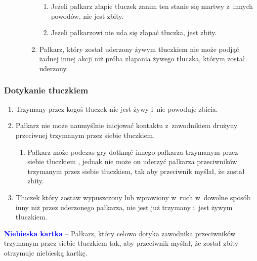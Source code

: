 \documentclass[12pt]{article}
\newcommand\bluecard[1]{\bgroup\textcolor{blue}{\textbf{#1}}}
\begin{document}
\begin{enumerate}
\begin{enumerate}
\begin{enumerate}
			                  \begin{enumerate}
				                  \item
				                        Jeżeli pałkarz złapie tłuczek zanim ten stanie się martwy z~innych powodów, nie jest zbity.
				                  \item
				                        Jeżeli pałkarzowi nie uda się złapać tłuczka, jest zbity.
			                  \end{enumerate}
			            \item
			                  Pałkarz, który został uderzony żywym tłuczkiem nie może podjąć
			                  żadnej innej akcji niż próba złapania żywego tłuczka, którym
			                  został uderzony.
		            \end{enumerate}
	      \end{enumerate}
\end{enumerate}

\subsubsection{Dotykanie tłuczkiem}

\begin{enumerate}
	\item
	      Trzymany przez kogoś tłuczek nie jest żywy i~nie powoduje zbicia.
	\item
	      Pałkarz nie może naumyślnie inicjować kontaktu z~zawodnikiem drużyny
	      przeciwnej trzymanym przez siebie tłuczkiem.

	      \begin{enumerate}
		      \item
		            Pałkarz może podczas gry dotknąć innego pałkarza trzymanym przez
		            siebie tłuczkiem , jednak nie może on uderzyć pałkarza przeciwników
		            trzymanym przez siebie tłuczkiem, tak aby przeciwnik myślał, że
		            został zbity.
	      \end{enumerate}
	\item
	      Tłuczek który zostaw wypuszczony lub wprawiony w~ruch w~dowolne sposób
	      inny niż przez uderzonego pałkarza, nie jest już trzymany i~jest żywym
	      tłuczkiem.
\end{enumerate}

\bluecard{Niebieska kartka} -- Pałkarz, który celowo dotyka zawodnika
przeciwników trzymanym przez siebie tłuczkiem tak, aby przeciwnik
myślał, że został zbity otrzymuje niebieską kartkę.
\end{document}
